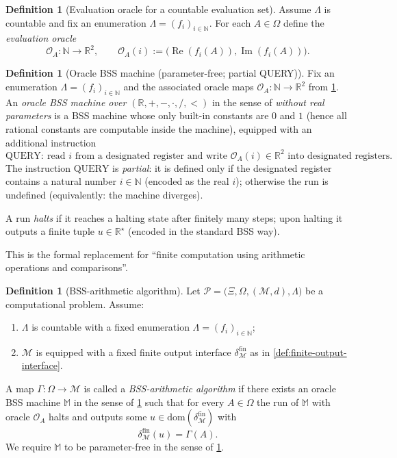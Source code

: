 \documentclass{lmcs} %
\theoremstyle{plain}
\theoremstyle{plain}
\theoremstyle{definition}
\newtheorem{definition}[theorem]{Definition}
\theoremstyle{remark}
\theoremstyle{definition}
\theoremstyle{remark}
\numberwithin{equation}{section}
\newcommand{\R}{\mathbb{R}}
\newcommand{\N}{\mathbb{N}}
\newcommand{\dom}{\mathrm{dom}}
\begin{document}
\begin{definition}[Evaluation oracle for a countable evaluation set]\label{def:eval-oracle}
Assume $\Lambda$ is countable and fix an enumeration $\Lambda=(f_i)_{i\in\N}$.
For each $A\in\Omega$ define the \textit{evaluation oracle}
\[
\mathcal{O}_A:\N\to\R^2,\qquad \mathcal{O}_A(i):=\bigl(\operatorname{Re}(f_i(A)),\operatorname{Im}(f_i(A))\bigr).
\]
\end{definition}

\begin{definition}[Oracle BSS machine (parameter-free; partial QUERY)]\label{def:oracle-bss}
Fix an enumeration $\Lambda=(f_i)_{i\in\N}$ and the associated oracle maps
$\mathcal{O}_A:\N\to\R^2$ from \cref{def:eval-oracle}.
An \textit{oracle BSS machine over $(\R,+,-,\cdot,/,<)$} in the sense of \cite{BSS98}
\textit{without real parameters} is a BSS machine whose only built-in constants are
$0$ and $1$ (hence all rational constants are computable inside the machine),
equipped with an additional instruction
\[
\mathrm{QUERY}: \
\text{read } i \text{ from a designated register and write } \mathcal{O}_A(i)\in\R^2
\text{ into designated registers.}
\]
The instruction $\mathrm{QUERY}$ is \textit{partial}: it is defined only if the designated
register contains a natural number $i\in\N$ (encoded as the real $i$); otherwise the run
is undefined (equivalently: the machine diverges).

A run \textit{halts} if it reaches a halting state after finitely many steps; upon halting it
outputs a finite tuple $u\in\R^\star$ (encoded in the standard BSS way).
\end{definition}

This is the formal replacement for \enquote{finite computation using arithmetic operations and comparisons}.
\begin{definition}[BSS-arithmetic algorithm]\label{def:BSS-arith-alg}
Let $\mathcal{P}=\bigl( \Xi,\Omega,(\mathcal{M},d),\Lambda \bigr)$ be a computational problem.
Assume:
\begin{enumerate}
\item $\Lambda$ is countable with a fixed enumeration $\Lambda=(f_i)_{i\in\N}$;
\item $\mathcal{M}$ is equipped with a fixed finite output interface
      $\delta^{\mathrm{fin}}_{\mathcal{M}}$ as in \cref{def:finite-output-interface}.
\end{enumerate}
A map $\Gamma:\Omega\to\mathcal{M}$ is called a \textit{BSS-arithmetic algorithm}
if there exists an oracle BSS machine $\mathbb{M}$ in the sense of \cref{def:oracle-bss}
such that for every $A\in\Omega$ the run of $\mathbb{M}$ with oracle $\mathcal{O}_A$
halts and outputs some $u\in\dom(\delta^{\mathrm{fin}}_{\mathcal{M}})$ with
\[
\delta^{\mathrm{fin}}_{\mathcal{M}}(u)=\Gamma(A).
\]
We require $\mathbb M$ to be parameter-free in the sense of \cref{def:oracle-bss}.
\end{definition}
\end{document}
